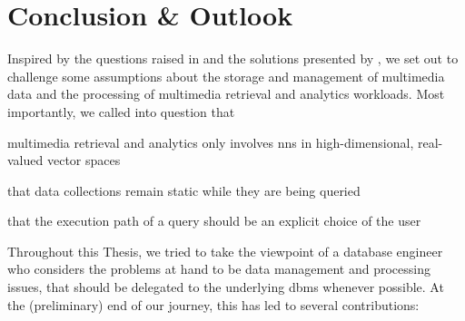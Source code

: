 \chapter{Conclusion \& Outlook}
\label{chapter:conclusion}


Inspired by the questions raised in \cite{Jonson:2016Ten} and the solutions presented by \cite{Giangreco:2018Database}, we set out to challenge some assumptions about the storage and management of multimedia data and the processing of multimedia retrieval and analytics workloads. Most importantly, we called into question that 
\begin{enumerate*}[label=(\roman*), itemjoin={{, }}, itemjoin*={{, and }}, after={{.}}]
    \item multimedia retrieval and analytics only involves \acrshort{nns} in high-dimensional, real-valued vector spaces
    \item that data collections remain static while they are being queried
    \item that  the execution path of a query should be an explicit choice of the user
\end{enumerate*} 
Throughout this Thesis, we tried to take the viewpoint of a database engineer who considers the problems at hand to be data management and processing issues, that should be delegated to the underlying \acrshort{dbms} whenever possible. At the (preliminary) end of our journey, this has led to several contributions:

